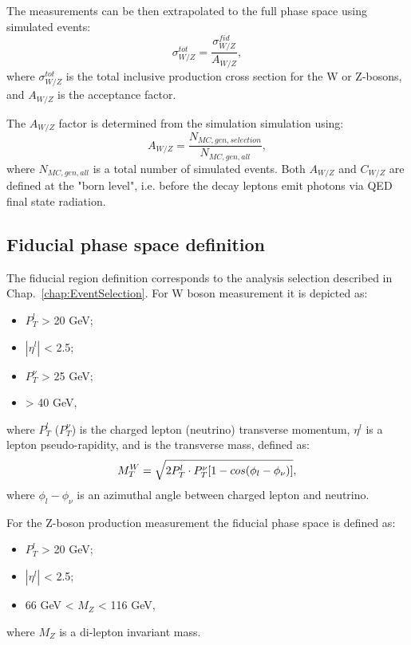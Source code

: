 The measurements can be then extrapolated to the full phase space using simulated events:
\begin{equation}
\sigma^{tot}_{W/Z}= \frac{\sigma^{fid}_{W/Z}}{A_{W/Z}},
\end{equation}
where $\sigma^{tot}_{W/Z}$ is the total inclusive production cross section for the W or Z-bosons, and $A_{W/Z}$  is the acceptance factor. 

The $A_{W/Z}$ factor is determined from the simulation simulation using: 
\begin{equation}
A_{W/Z}=\frac{N_{MC,gen, selection}}{N_{MC,gen,all}},
\end{equation}
where $N_{MC,gen,all}$ is a total number of simulated events. Both $A_{W/Z}$ and $C_{W/Z}$ are defined at the "born level", i.e. before the decay leptons emit photons via QED final state radiation.

\subsection{Fiducial phase space definition}
The fiducial region definition corresponds to the analysis selection described in Chap.~\ref{chap:EventSelection}. For W boson measurement it is depicted as:
\begin{itemize}
\item $P_T^l$ > 20 GeV;
\item $|\eta^l|$ < 2.5;
\item $P_T^{\nu}$ > 25 GeV;
\item \mtw > 40 GeV,
\end{itemize}
where $P_T^l$  ($P_T^{\nu}$) is the charged lepton (neutrino) transverse momentum, $\eta^l $ is a lepton pseudo-rapidity, and \mtw is the transverse mass, defined as:
\begin{equation}\label{Eq:mtW}
M_T^W = \sqrt{ 2 P_T^l \cdot P_T^{\nu} [ 1 - cos (\phi_l - \phi_{\nu})]},
\end{equation}
where $\phi_l - \phi_{\nu}$ is an azimuthal angle between charged lepton and neutrino.

For the Z-boson production measurement the fiducial phase space is defined as:
\begin{itemize}
\item $P_T^l$ > 20 GeV;
\item $|\eta^l|$ < 2.5;
\item 66 GeV < $M_{Z}$ < 116 GeV,
\end{itemize}
where $M_{Z}$ is a di-lepton invariant mass. 

